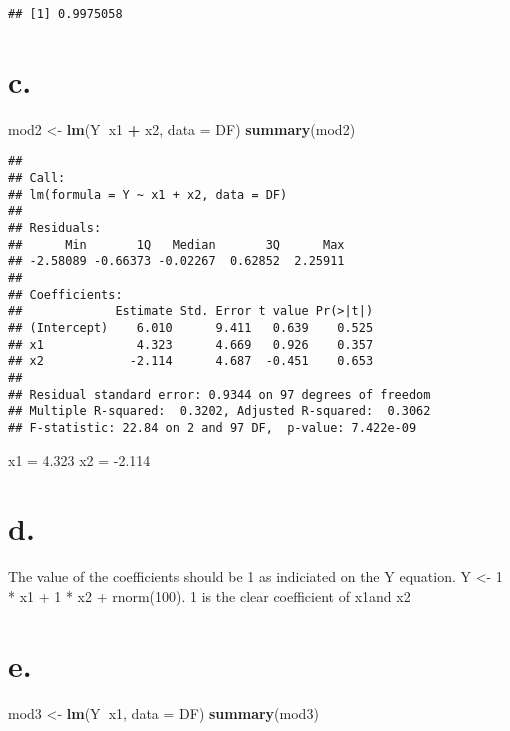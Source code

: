 \documentclass[]{article}
\newenvironment{Shaded}{\begin{snugshade}}{\end{snugshade}}
\newcommand{\KeywordTok}[1]{\textcolor[rgb]{0.13,0.29,0.53}{\textbf{#1}}}
\newcommand{\DataTypeTok}[1]{\textcolor[rgb]{0.13,0.29,0.53}{#1}}
\newcommand{\StringTok}[1]{\textcolor[rgb]{0.31,0.60,0.02}{#1}}
\newcommand{\OperatorTok}[1]{\textcolor[rgb]{0.81,0.36,0.00}{\textbf{#1}}}
\newcommand{\NormalTok}[1]{#1}
\begin{document}
\begin{verbatim}
## [1] 0.9975058
\end{verbatim}

\section{c.}\label{c.-1}

\begin{Shaded}
\begin{Highlighting}[]
\NormalTok{mod2 <-}\StringTok{ }\KeywordTok{lm}\NormalTok{(Y}\OperatorTok{~}\NormalTok{x1 }\OperatorTok{+}\StringTok{ }\NormalTok{x2, }\DataTypeTok{data =}\NormalTok{ DF)}
\KeywordTok{summary}\NormalTok{(mod2)}
\end{Highlighting}
\end{Shaded}

\begin{verbatim}
## 
## Call:
## lm(formula = Y ~ x1 + x2, data = DF)
## 
## Residuals:
##      Min       1Q   Median       3Q      Max 
## -2.58089 -0.66373 -0.02267  0.62852  2.25911 
## 
## Coefficients:
##             Estimate Std. Error t value Pr(>|t|)
## (Intercept)    6.010      9.411   0.639    0.525
## x1             4.323      4.669   0.926    0.357
## x2            -2.114      4.687  -0.451    0.653
## 
## Residual standard error: 0.9344 on 97 degrees of freedom
## Multiple R-squared:  0.3202, Adjusted R-squared:  0.3062 
## F-statistic: 22.84 on 2 and 97 DF,  p-value: 7.422e-09
\end{verbatim}

x1 = 4.323 x2 = -2.114

\section{d.}\label{d.-1}

The value of the coefficients should be 1 as indiciated on the Y
equation. Y \textless{}- 1 * x1 + 1 * x2 + rnorm(100). 1 is the clear
coefficient of x1and x2

\section{e.}\label{e.-1}

\begin{Shaded}
\begin{Highlighting}[]
\NormalTok{mod3 <-}\StringTok{ }\KeywordTok{lm}\NormalTok{(Y}\OperatorTok{~}\NormalTok{x1, }\DataTypeTok{data =}\NormalTok{  DF)}
\KeywordTok{summary}\NormalTok{(mod3)}
\end{Highlighting}
\end{Shaded}
\end{document}

